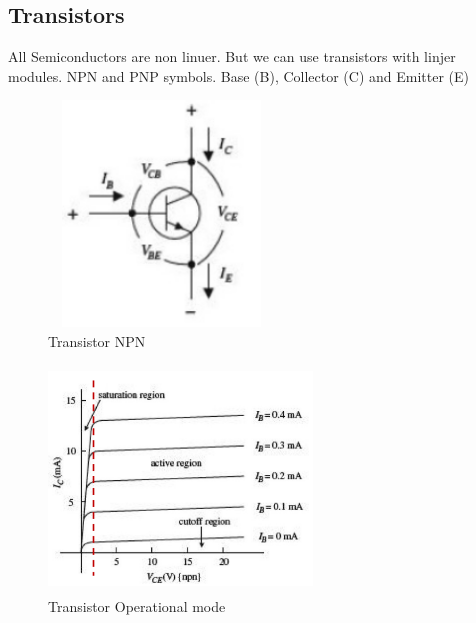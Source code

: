 \documentclass{article}
\begin{document}
\newpage
\subsection{Transistors}
All Semiconductors are non linuer. But we can use transistors with linjer modules. \newline
NPN and PNP symbols. Base (B), Collector (C) and Emitter (E)
\begin{figure}[h]
    \vspace{10mm}
    \centering
    \includegraphics[width=6cm, height=6cm]{image/transistor-NPN.png}
    \caption{Transistor NPN}
\end{figure}

\begin{figure}[h]
    \vspace{10mm}
    \centering
    \includegraphics[width=7cm, height=6cm]{image/transistor_operation-mode.png}
    \caption{Transistor Operational mode}
\end{figure}
\end{document}

